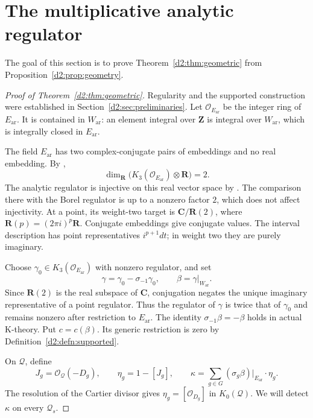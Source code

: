 \documentclass[11pt,a4paper]{amsart}
\numberwithin{equation}{section}
\theoremstyle{definition}
\theoremstyle{remark}
\newcommand{\DtwoZZ}{\mathbf{Z}}
\newcommand{\DtwoRR}{\mathbf{R}}
\newcommand{\DtwoCC}{\mathbf{C}}
\newcommand{\DtwocO}{\mathcal O}
\newcommand{\DtwocQ}{\mathcal Q}
\newcommand{\Dtwoar}{\mathrm{ar}}
\begin{document}
\section{The multiplicative analytic regulator}\label{d2:sec:analytic}

The goal of this section is to prove Theorem~\ref{d2:thm:geometric} from
Proposition~\ref{d2:prop:geometry}.

\begin{proof}[Proof of Theorem~\ref{d2:thm:geometric}]
Regularity and the supported construction were established in
Section~\ref{d2:sec:preliminaries}.
Let \(\DtwocO_{E_{\Dtwoar}}\) be the integer ring of \(E_{\Dtwoar}\).
It is contained in \(W_{\Dtwoar}\): an element integral over \(\DtwoZZ\)
is integral over \(W_{\Dtwoar}\), which is integrally closed in
\(E_{\Dtwoar}\).

The field \(E_{\Dtwoar}\) has two complex-conjugate pairs of embeddings
and no real embedding. By \cite[Proposition~12.2]{Borel},
\[
 \dim_\DtwoRR\bigl(K_3(\DtwocO_{E_{\Dtwoar}})\otimes\DtwoRR\bigr)=2.
\]
The analytic regulator is injective on this real vector space by
\cite[Section~6, especially~(6.4)]{BunkeTamme}.
The comparison there with the Borel regulator is up to a nonzero
factor \(2\), which does not affect injectivity.
At a point, its weight-two target is \(\DtwoCC/\DtwoRR(2)\), where
\(\DtwoRR(p)=(2\pi i)^p\DtwoRR\).
Conjugate embeddings give conjugate values.
The interval description has point representatives
\(i^{p+1}dt\); in weight two they are purely imaginary.

Choose \(\gamma_0\in K_3(\DtwocO_{E_{\Dtwoar}})\) with nonzero regulator,
and set
\[
 \gamma=\gamma_0-\sigma_{-1}\gamma_0,\qquad
 \beta=\gamma|_{W_{\Dtwoar}}.
\]
Since \(\DtwoRR(2)\) is the real subspace of \(\DtwoCC\), conjugation negates
the unique imaginary representative of a point regulator.
Thus the regulator of \(\gamma\) is twice that of \(\gamma_0\)
and remains nonzero after restriction to \(E_{\Dtwoar}\).
The identity \(\sigma_{-1}\beta=-\beta\) holds in actual K-theory.
Put \(c=c(\beta)\).
Its generic restriction is zero by Definition~\ref{d2:defn:supported}.

On \(\DtwocQ\), define
\[
 J_g=\DtwocO_{\DtwocQ}(-D_g),\qquad
 \eta_g=1-[J_g],\qquad
 \kappa=\sum_{g\in G}(\sigma_g\beta)|_{E_{\Dtwoar}}\cdot\eta_g.
\]
The resolution of the Cartier divisor gives
\(\eta_g=[\DtwocO_{D_g}]\) in \(K_0(\DtwocQ)\).
We will detect \(\kappa\) on every \(\DtwocQ_s\).


\end{proof}
\end{document}
